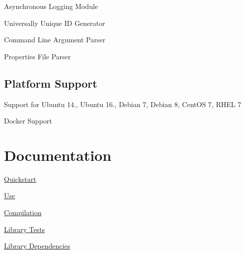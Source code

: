 \begin{DoxyItemize}
\item Asynchronous Logging Module
\item Universally Unique ID Generator
\item Command Line Argument Parser
\item Properties File Parser
\end{DoxyItemize}\hypertarget{index_platform}{}\subsection{Platform Support}\label{index_platform}

\begin{DoxyItemize}
\item Support for Ubuntu 14., Ubuntu 16., Debian 7, Debian 8, Cent\+OS 7, R\+H\+EL 7
\item Docker Support
\end{DoxyItemize}\hypertarget{index_docs}{}\section{Documentation}\label{index_docs}

\begin{DoxyItemize}
\item \hyperlink{quickstart}{Quickstart}
\item \hyperlink{use_index}{Use}
\item \hyperlink{compilation}{Compilation}
\item \hyperlink{tests}{Library Tests}
\item \hyperlink{dependencies}{Library Dependencies} 
\end{DoxyItemize}